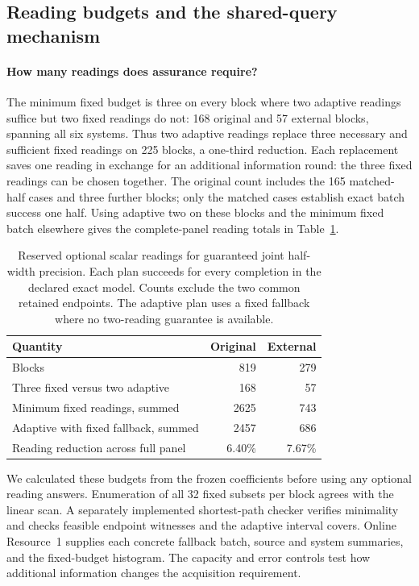 \documentclass[12pt]{article}
\begin{document}
\subsection{Reading budgets and the shared-query mechanism}
\paragraph{How many readings does assurance require?}
The minimum fixed budget is three on every block where two adaptive
readings suffice but two fixed readings do not: 168 original and 57 external
blocks, spanning all six systems. Thus two adaptive readings replace three
necessary and sufficient fixed readings on 225 blocks, a one-third reduction.
Each replacement saves one reading in exchange for an additional information
round: the three fixed readings can be chosen together.
The original count includes the 165 matched-half cases and three further
blocks; only the matched cases establish exact batch success one half.
Using adaptive two on these blocks and the minimum fixed batch elsewhere
gives the complete-panel reading totals in Table~\ref{tab:minimum-reading-budget}.

\begin{table}[htbp]\centering\small
\caption{Reserved optional scalar readings for guaranteed joint half-width
precision. Each plan succeeds for every completion in the declared exact
model. Counts exclude the two common retained endpoints. The adaptive plan
uses a fixed fallback where no two-reading guarantee is available.}
\label{tab:minimum-reading-budget}
\begin{tabular}{lrr}\toprule
Quantity & Original & External\\\midrule
Blocks & 819 & 279\\
Three fixed versus two adaptive & 168 & 57\\
Minimum fixed readings, summed & 2625 & 743\\
Adaptive with fixed fallback, summed & 2457 & 686\\
Reading reduction across full panel & 6.40\% & 7.67\%\\\bottomrule
\end{tabular}
\end{table}

We calculated these budgets from the frozen coefficients before using any
optional reading answers.
Enumeration of all 32 fixed subsets per block agrees with the linear scan.
A separately implemented shortest-path checker verifies minimality and
checks feasible endpoint witnesses and the adaptive interval covers.
Online Resource~1 supplies each concrete fallback batch, source and system
summaries, and the fixed-budget histogram. The capacity and error controls
test how additional information changes the acquisition requirement.
\end{document}
